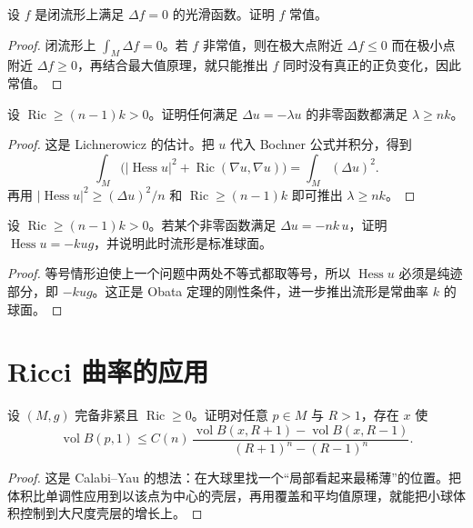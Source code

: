\documentclass[11pt,a4paper,openany]{ctexbook}
\numberwithin{equation}{chapter}
\begin{document}
\begin{problem}
设 \(f\) 是闭流形上满足 \(\Delta f=0\) 的光滑函数。证明 \(f\) 常值。
\end{problem}
\begin{proof}
闭流形上 \(\int_M \Delta f=0\)。若 \(f\) 非常值，则在极大点附近 \(\Delta f\le 0\) 而在极小点附近 \(\Delta f\ge 0\)，再结合最大值原理，就只能推出 \(f\) 同时没有真正的正负变化，因此常值。
\end{proof}

\begin{problem}
设 \(\operatorname{Ric}\ge (n-1)k>0\)。证明任何满足 \(\Delta u=-\lambda u\) 的非零函数都满足 \(\lambda\ge nk\)。
\end{problem}
\begin{proof}
这是 Lichnerowicz 的估计。把 \(u\) 代入 Bochner 公式并积分，得到
\[
\int_M \bigl(|\operatorname{Hess}u|^2+\operatorname{Ric}(\nabla u,\nabla u)\bigr)
=\int_M (\Delta u)^2.
\]
再用 \(|\operatorname{Hess}u|^2\ge (\Delta u)^2/n\) 和 \(\operatorname{Ric}\ge (n-1)k\) 即可推出 \(\lambda\ge nk\)。
\end{proof}

\begin{problem}
设 \(\operatorname{Ric}\ge (n-1)k>0\)。若某个非零函数满足 \(\Delta u=-nk\,u\)，证明 \(\operatorname{Hess}u=-kug\)，并说明此时流形是标准球面。
\end{problem}
\begin{proof}
等号情形迫使上一个问题中两处不等式都取等号，所以 \(\operatorname{Hess}u\) 必须是纯迹部分，即 \(-kug\)。这正是 Obata 定理的刚性条件，进一步推出流形是常曲率 \(k\) 的球面。
\end{proof}

\section{Ricci 曲率的应用}

\begin{problem}
设 \((M,g)\) 完备非紧且 \(\operatorname{Ric}\ge 0\)。证明对任意 \(p\in M\) 与 \(R>1\)，存在 \(x\) 使
\[
\operatorname{vol}B(p,1)\le C(n)\,\frac{\operatorname{vol}B(x,R+1)-\operatorname{vol}B(x,R-1)}{(R+1)^n-(R-1)^n}.
\]
\end{problem}
\begin{proof}
这是 Calabi--Yau 的想法：在大球里找一个“局部看起来最稀薄”的位置。把体积比单调性应用到以该点为中心的壳层，再用覆盖和平均值原理，就能把小球体积控制到大尺度壳层的增长上。
\end{proof}
\end{document}

